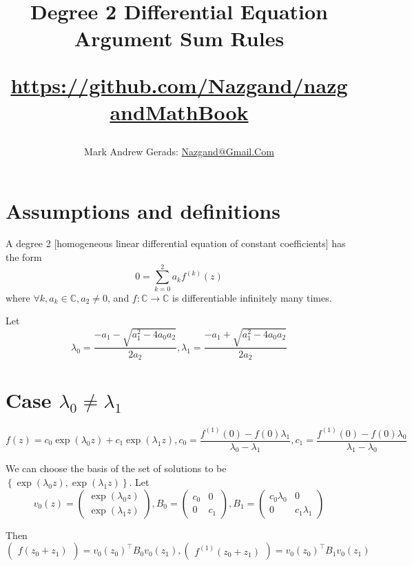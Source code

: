 \documentclass[]{article}
\author{Mark Andrew Gerads: \href{MailTo:Nazgand@Gmail.Com}{Nazgand@Gmail.Com}}
\title{
	Degree 2 Differential Equation Argument Sum Rules
	
	\href{https://github.com/Nazgand/nazgandMathBook}{https://github.com/Nazgand/nazgandMathBook}
}
\newcommand{\pqty}[1]{{\left(#1\right)}}
\newcommand{\Bqty}[1]{{\left\{#1\right\}}}
\numberwithin{equation}{section}
\begin{document}
	
	\maketitle
	
	\section{Assumptions and definitions}
	A degree 2 [homogeneous linear differential equation of constant coefficients] has the form
	\begin{equation}
		\label{DifferentialEquation}
		0=\sum_{k=0}^{2}a_k f^\pqty{k}\pqty{z}
	\end{equation}
	where $\forall k, a_k\in\mathbb{C}, a_2 \neq 0$, and $f:\mathbb{C}\to\mathbb{C}$ is differentiable infinitely many times.
	
	Let 
	\begin{equation}
		\lambda_0=\frac{-a_1-\sqrt{a_1^2-4 a_0 a_2}}{2 a_2},
		\lambda_1=\frac{-a_1+\sqrt{a_1^2-4 a_0 a_2}}{2 a_2}
	\end{equation}
	
	\section{Case $\lambda_0\neq\lambda_1$}
	\begin{equation}
		f\pqty{z}=c_0 \exp\pqty{\lambda_0 z}+c_1 \exp\pqty{\lambda_1 z},
		c_0=\frac{f^\pqty{1}\pqty{0}-f\pqty{0}\lambda_1}{\lambda_0-\lambda_1},
		c_1=\frac{f^\pqty{1}\pqty{0}-f\pqty{0}\lambda_0}{\lambda_1-\lambda_0}
	\end{equation}
	
	We can choose the basis of the set of solutions to be $\Bqty{\exp\pqty{\lambda_0 z}, \exp\pqty{\lambda_1 z}}$.
	Let
	\begin{equation}
		v_0\pqty{z}=
		\begin{pmatrix}
			\exp\pqty{\lambda_0 z} \\
			\exp\pqty{\lambda_1 z}
		\end{pmatrix}
		,
		B_0=
		\begin{pmatrix}
			c_0 & 0 \\
			0 & c_1
		\end{pmatrix}
		,
		B_1=
		\begin{pmatrix}
			c_0 \lambda_0 & 0 \\
			0 & c_1 \lambda_1
		\end{pmatrix}
	\end{equation}
	
	Then
	\begin{equation}
		\begin{pmatrix}
			f\pqty{z_0+z_1}
		\end{pmatrix}
		=v_0\pqty{z_0}^\top B_0 v_0\pqty{z_1}
		,
		\begin{pmatrix}
			f^\pqty{1}\pqty{z_0+z_1}
		\end{pmatrix}
		=v_0\pqty{z_0}^\top B_1 v_0\pqty{z_1}
	\end{equation}
	
\end{document}
